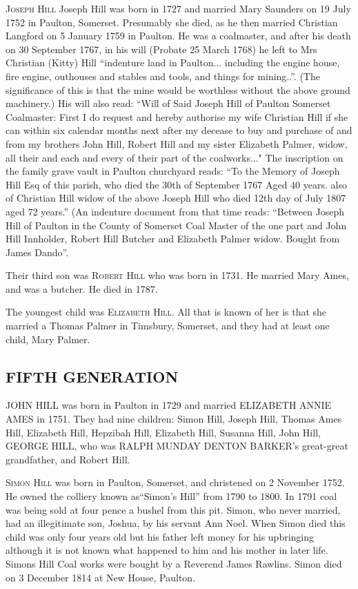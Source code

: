 \textsc{Joseph Hill} Joseph Hill was born in 1727 and married Mary Saunders on 19 July 1752 in Paulton, Somerset.  Presumably she died, as he then married Christian Langford on 5 January 1759 in Paulton. He was a coalmaster, and after his death on
30 September 1767, in his will (Probate 25 March 1768) he left to Mrs Christian (Kitty) Hill ``indenture land in Paulton... including the engine house, fire engine, outhouses and stables and tools, and things for mining..''.  (The significance of this is that the mine would be worthless without the above ground machinery.) His will also read: ``Will of Said Joseph Hill of Paulton Somerset Coalmaster:  First I do request and hereby authorise my wife Christian Hill if she can within six calendar months next after my decease to buy and purchase of and from my brothers John Hill, Robert Hill and my sister Elizabeth Palmer, widow, all their and each and every of their part of the coalworks..."  The inscription on the family grave vault in Paulton churchyard reads:
``To the Memory of Joseph Hill Esq of this parish, who died the 30th of September 1767 Aged 40 years.
  also of Christian Hill widow of the above Joseph Hill who died 12th day of July 1807 aged 72 years.''
(An indenture document from that time reads: ``Between Joseph Hill of Paulton in the County of Somerset Coal Master of the one part and John Hill Innholder, Robert Hill Butcher and Elizabeth Palmer widow. Bought from James Dando''.

Their third son was \textsc{Robert Hill} who was born in 1731. He married Mary Ames, and was a butcher. He died in 1787. 	

The youngest child was \textsc{Elizabeth Hill}. All that is known of her is that she married a Thomas Palmer in Timsbury, Somerset, and they had at least one child, Mary Palmer.

\subsection{FIFTH GENERATION}

\uppercase{John Hill} was born in Paulton in 1729 and married \uppercase{Elizabeth Annie Ames} in 1751.  They had nine children: Simon Hill, Joseph Hill, Thomas Ames Hill, Elizabeth Hill, Hepzibah Hill, Elizabeth Hill, Susanna Hill, John Hill, \uppercase{ George Hill}, who was \uppercase{Ralph Munday Denton Barker}'s great-great grandfather, and Robert Hill.

\textsc{Simon Hill} was born in Paulton, Somerset,  and christened on 2 November 1752. He owned the colliery known as``Simon's Hill'' from 1790 to 1800. In 1791 coal was being sold at four pence a bushel from this pit. Simon, who never married, had an illegitimate son, Joshua, by his servant Ann Noel. When Simon died this child was only four years old but his father left money for his upbringing although it is not known what happened to him and his mother in later life. Simons Hill Coal works were bought by a Reverend James Rawlins. Simon died on 3 December 1814 at New House, Paulton.


